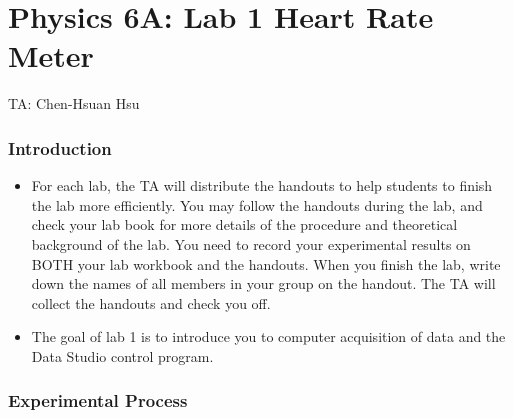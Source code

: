 \documentclass{article}
\begin{document}
\part*{\LARGE{Physics 6A: Lab 1 Heart Rate Meter}}
TA: Chen-Hsuan Hsu\\
\vspace{-0.3in}
\section*{Introduction}
\begin{itemize}
\item For each lab, the TA will distribute the handouts to help students to finish the lab more efficiently. You may follow the handouts during the lab, and check your lab book for more details of the procedure and theoretical background of the lab. You need to record your experimental results on BOTH your lab workbook and the handouts. When you finish the lab, write down the names of all members in your group on the handout. The TA will collect the handouts and check you off. 

\item The goal of lab 1 is to introduce you to computer acquisition of data and the Data Studio control program.


\end{itemize}

\section*{Experimental Process}
\end{document}
